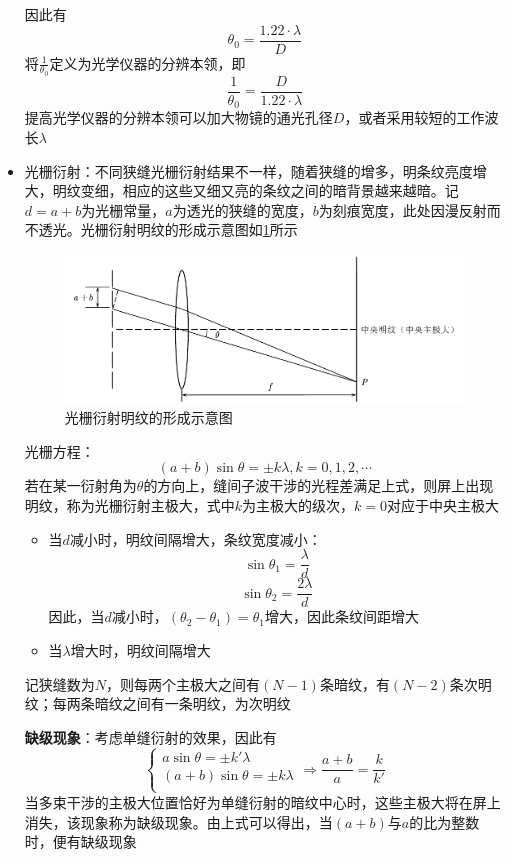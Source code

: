 \documentclass[12pt, a4paper, twoside]{ctexbook}
\begin{document}
\begin{itemize}
\begin{figure}[H]
    \end{figure}
    因此有
    $$
    \theta_0=\frac{1.22\cdot\lambda}{D}
    $$
    将$\frac{1}{\theta_0}$定义为光学仪器的分辨本领，即
    $$
    \frac{1}{\theta_0}=\frac{D}{1.22\cdot\lambda}
    $$
    提高光学仪器的分辨本领可以加大物镜的通光孔径$D$，或者采用较短的工作波长$\lambda$
    \item {\sonti 光栅衍射}：不同狭缝光栅衍射结果不一样，随着狭缝的增多，明条纹亮度增大，明纹变细，相应的这些又细又亮的条纹之间的暗背景越来越暗。记$d=a+b$为光栅常量，$a$为透光的狭缝的宽度，$b$为刻痕宽度，此处因漫反射而不透光。光栅衍射明纹的形成示意图如\textcolor{blue}{\cref{fig:光栅衍射}}所示
    \begin{figure}[H]
        \centerline{\includegraphics[scale=0.90]{光栅衍射.pdf}}
        \caption{光栅衍射明纹的形成示意图}\label{fig:光栅衍射}
    \end{figure}
    光栅方程：
    $$
    \left(a+b\right)\sin\theta=\pm k\lambda,k=0,1,2,\cdots
    $$
    若在某一衍射角为$\theta$的方向上，缝间子波干涉的光程差满足上式，则屏上出现明纹，称为光栅衍射主极大，式中$k$为主极大的级次，$k=0$对应于中央主极大
    \begin{itemize}
        \item 当$d$减小时，明纹间隔增大，条纹宽度减小：
        $$
        \sin\theta_1=\frac{\lambda}{d}
        $$
        $$
        \sin\theta_2=\frac{2\lambda}{d}
        $$
        因此，当$d$减小时，$\left(\theta_2-\theta_1\right)=\theta_1$增大，因此条纹间距增大
        \item 当$\lambda$增大时，明纹间隔增大
    \end{itemize}
    记狭缝数为$N$，则每两个主极大之间有$\left(N-1\right)$条暗纹，有$\left(N-2\right)$条次明纹；每两条暗纹之间有一条明纹，为次明纹
    
    \textbf{缺级现象}：考虑单缝衍射的效果，因此有
    $$
    \left\{ \begin{array}{l}
        a\sin\theta =\pm k'\lambda\\
        \left( a+b \right) \sin \theta =\pm k\lambda\\
    \end{array}\Rightarrow \frac{a+b}{a}=\frac{k}{k'} \right. 
    $$
    当多束干涉的主极大位置恰好为单缝衍射的暗纹中心时，这些主极大将在屏上消失，该现象称为缺级现象。由上式可以得出，当$\left(a+b\right)$与$a$的比为整数时，便有缺级现象
\end{itemize}
\end{document}
